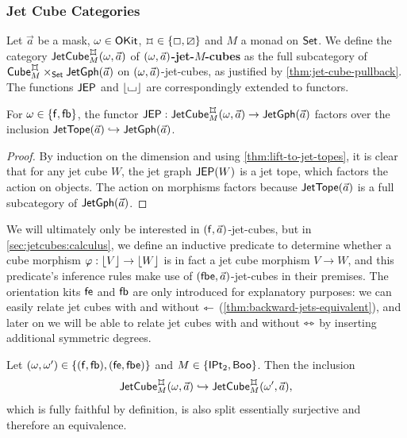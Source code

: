 \documentclass[a4paper]{memoir}
\begin{document}
\subsubsection{Jet Cube Categories}
\begin{definition} \label{def:jet-cube-cat}
	Let $\vec a$ be a mask, $\omega \in {\mathsf{OKit}}$, $\mycubex \in \accol{\affine, \cartes}$ and $M$ a monad on ${\mathsf{Set}}$.
	We define
	the category $\jetcube{\myorix}{\mycubex}{M}{\vec a}$ of \textbf{$(\omega, \vec a)$-jet-$M$-cubes}
	as the full subcategory of $\cubecat^\mycubex_M \times_\Set \jetgph{\vec a}$ on $(\omega, \vec a)$-jet-cubes, as justified by \cref{thm:jet-cube-pullback}.
	The functions $\mathsf{JEP}$ and $\mathopen{}\left\lfloor {\llcorner\hspace{-.4ex}\lrcorner} \right\rfloor\mathclose{}$ are correspondingly extended to functors.
\end{definition}
\begin{corollary} \label{thm:jet-cubes-are-topes}
	For $\omega \in \mathopen{}\left\{ {\mathsf{f}}, {\mathsf{fb}} \right\}\mathclose{}$, the functor $\JEP : \jetcube{\myorix}{\mycubex}{M}{\vec a} \to \jetgph{\vec a}$ factors over the inclusion $\mathsf{JetTope}(\vec a) \hookrightarrow \mathsf{JetGph}(\vec a)$.
\end{corollary}
\begin{proof}
	By induction on the dimension and using \cref{thm:lift-to-jet-topes}, it is clear that for any jet cube $W$, the jet graph $\mathsf{JEP}(W)$ is a jet tope, which factors the action on objects. The action on morphisms factors because $\mathsf{JetTope}(\vec a)$ is a full subcategory of $\mathsf{JetGph}(\vec a)$.
\end{proof}
We will ultimately only be interested in $({\mathsf{f}}, \vec a)$-jet-cubes, but in \cref{sec:jetcubes:calculus}, we define an inductive predicate to determine whether a cube morphism $\varphi : \mathopen{}\left\lfloor V \right\rfloor\mathclose{} \to \mathopen{}\left\lfloor W \right\rfloor\mathclose{}$ is in fact a jet cube morphism $V \to W$, and this predicate's inference rules make use of $({\mathsf{fbe}}, \vec a)$-jet-cubes in their premises.
The orientation kits ${\mathsf{fe}}$ and ${\mathsf{fb}}$ are only introduced for explanatory purposes: we can easily relate jet cubes with and without $\leftarrowtriangle$ (\cref{thm:backward-jets-equivalent}), and later on we will be able to relate jet cubes with and without $\leftrightarrowtriangle$ by inserting additional symmetric degrees.
\begin{proposition} \label{thm:backward-jets-equivalent}
	Let $(\omega, \omega') \in \mathopen{}\left\{ ({\mathsf{f}}, {\mathsf{fb}}), ({\mathsf{fe}}, {\mathsf{fbe}}) \right\}\mathclose{}$ and $M \in \mathopen{}\left\{ {\mathsf{IPt}_2}, \mathsf{Boo} \right\}\mathclose{}$.
	Then the inclusion
	\[
		\jetcube{\myorix}{\mycubex}{M}{\vec a} \hookrightarrow \jetcube{\myorix'}{\mycubex}{M}{\vec a},
	\]
	which is fully faithful by definition, is also split essentially surjective and therefore an equivalence.
\end{proposition}
\end{document}
